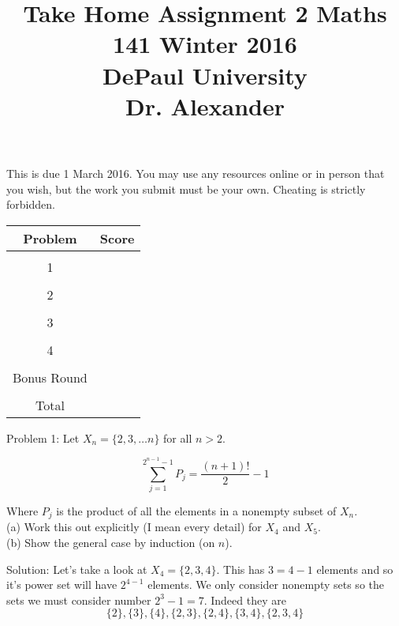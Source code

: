 \documentclass[16 pt]{amsart}
\theoremstyle{definition}
\theoremstyle{remark}
\numberwithin{equation}{subsection}
\begin{document}
\title{Take Home Assignment 2 Maths 141 Winter 2016 \\ DePaul University\\Dr. Alexander}
\maketitle
This is due 1 March 2016.  You may use any resources online or in person that you wish, but the work you submit must be your own.  Cheating is strictly forbidden.
\vspace{1in}


\begin{center}
  \begin{tabular}{ c | c }
    Problem & Score\\
    \hline
    &\\
    1&\\
    &\\
    2&\\
    &\\
    3&\\
    &\\
    4&\\
    &\\
    Bonus Round 
    &\\
    \hline 
    &\\    
    Total& 
 \end{tabular}
\end{center}


\newpage


Problem 1: Let $X_n = \{2,3,\dots n\}$ for all $n>2$.  

\[
\sum_{j=1}^{2^{n-1}-1} P_j = \frac{(n+1)!}{2}-1
\]

Where $P_j$ is the product of all the elements in a nonempty subset of $X_n$.\\


(a) Work this out explicitly (I mean every detail) for $X_4$ and $X_5$.\\

(b) Show the general case by induction (on $n$).

\vspace{.5in}

Solution: Let's take a look at $X_4 = \{2,3,4\}$.  This has $3 = 4-1$ elements and so it's power set will have $2^{4-1}$ elements.  We only consider nonempty sets so the sets we must consider number $2^3-1 = 7$.  Indeed they are
\[
\{2\},\{3\},\{4\},\{2,3\},\{2,4\},\{3,4\},\{2,3,4\}
\]
\end{document}
